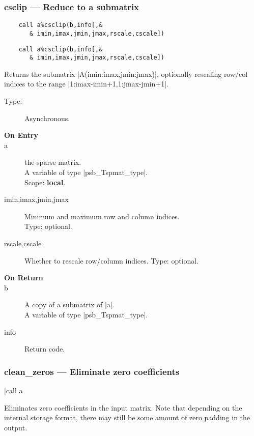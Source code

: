 \subsubsection{csclip --- Reduce to a submatrix}

\ifpdf
\begin{verbatim}
    call a%csclip(b,info[,&
       & imin,imax,jmin,jmax,rscale,cscale])
\end{verbatim}
\else
\begin{verbatim}
    call a%csclip(b,info[,&
       & imin,imax,jmin,jmax,rscale,cscale])
\end{verbatim}
\fi

Returns the submatrix \fortinline|A(imin:imax,jmin:jmax)|, optionally
rescaling row/col indices to the range
\fortinline|1:imax-imin+1,1:jmax-jmin+1|.  
\begin{description}
\item[Type:] Asynchronous.
\item[\bf On Entry]
\item[a] the sparse matrix.\\
A variable of type \fortinline|psb_Tspmat_type|.\\
Scope: {\bf local}.\\
\item[imin,imax,jmin,jmax] Minimum and maximum row and column indices.\\
Type: optional.
\item[rscale,cscale] Whether to rescale row/column indices.
Type: optional.
\end{description}
\begin{description}
\item[\bf On Return]
\item[b] A copy  of a submatrix of \fortinline|a|.\\
A variable of type \fortinline|psb_Tspmat_type|.
\item[info] Return code. 
\end{description}

\subsubsection{clean\_zeros --- Eliminate zero coefficients}
\fortinline|call a%

Eliminates zero coefficients in the input matrix. Note that depending
on the internal storage format, there may still be some amount of
zero padding in the output.

